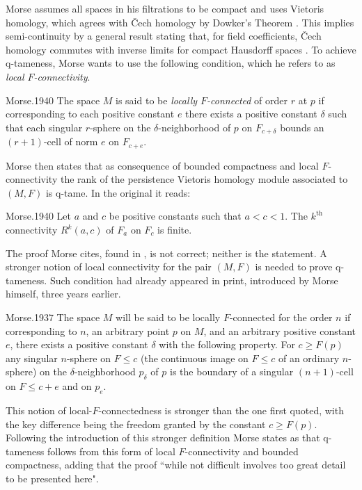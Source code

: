 Morse assumes all spaces in his filtrations to be compact and uses Vietoris homology, which agrees with \v{C}ech homology by Dowker's Theorem \cite{Dowker.1952}. This implies semi-continuity by a general result stating that, for field coefficients, \v{C}ech homology commutes with inverse limits for compact Hausdorff spaces \cite[Theorem VIII.3.6 and Theorem X.3.1]{MR0050886}. To achieve q-tameness, Morse wants to use the following condition, which he refers to as \textit{local $F$-connectivity}. 
\begin{displaycquote}[p.431]{Morse.1940}
	The space $M$ is said to be \textit{locally $F$-connected} of order $r$ at $p$ if corresponding to each positive constant $e$ there exists a positive constant $\delta$ such that each singular $r$-sphere on the $\delta$-neighborhood of $p$ on $F_{c+\delta}$ bounds an $(r+1)$-cell of norm $e$ on $F_{c+e}$.
\end{displaycquote}
Morse then states that as consequence of bounded compactness and local $F$-connectivity the rank of the persistence Vietoris homology module associated to $(M, F)$ is q-tame.
In the original it reads:
\begin{displaycquote}[Theorem 6.3, p.432]{Morse.1940}
	Let $a$ and $c$ be positive constants such that $a < c < 1$.
	The $k^{\mathrm{th}}$ connectivity $R^k(a,c)$ of $F_a$ on $F_c$ is finite.
\end{displaycquote}
The proof Morse cites, found in \cite[Theorem 6.1]{Morse.1938}, is not correct; neither is the statement.
A stronger notion of local connectivity for the pair $(M, F)$ is needed to prove q-tameness.
Such condition had already appeared in print, introduced by Morse himself, three years earlier.
\begin{displaycquote}[p.421-422]{Morse.1937}
	The space $M$ will be said to be locally $F$-connected for the order $n$ if corresponding to $n$, an arbitrary point $p$ on $M$, and an arbitrary positive constant $e$, there exists a positive constant $\delta$ with the following property. For $c \geq F(p)$ any singular $n$-sphere on $F \leq c$ (the continuous image on $F \leq c$ of an ordinary $n$-sphere) on the $\delta$-neighborhood $p_{\delta}$ of $p$ is the boundary of a singular $(n + 1)$-cell on $F \leq c + e$ and on $p_e$.
\end{displaycquote}
This notion of local-$F$-connectedness is stronger than the one first quoted, with the key difference being the freedom granted by the constant $c \geq F(p)$.
Following the introduction of this stronger definition Morse states as \cite[Theorem~9.2, p.422]{Morse.1937} that q-tameness follows from this form of local $F$-connectivity and bounded compactness, adding that the proof ``while not difficult involves too great detail to be presented here".

